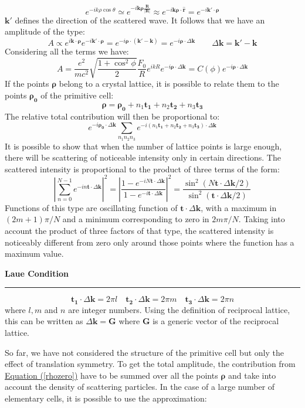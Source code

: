\documentclass[10.75pt,a4paper,openright,bottom=2cm]{article}
\renewcommand{\Vec}[1]{\boldsymbol{#1}}
\begin{document}
\[
e^{-ik\rho\cos\theta}\simeq e^{-i\Vec{k}\Vec{\rho}\frac{\Vec{R}}{|\Vec{R}|}}\approx e^{-i\Vec{k}\Vec{\rho}\cdot\Vec{\hat{r}}}=e^{-i\Vec{k'}\cdot\Vec{\rho}}
\]
$\Vec{k'}$ defines the direction of the scattered wave. It follows that we have an amplitude of the type:
\[
A\propto e^{i\Vec{k}\cdot\Vec{\rho}}e^{-i\Vec{k}'\cdot\Vec{\rho}}=e^{-i\Vec{\rho}\cdot(\Vec{k}'-\Vec{k})}=e^{-i\Vec{\rho}\cdot\Delta\Vec{k}} \qquad \Delta\Vec{k}=\Vec{k}'-\Vec{k}
\]
Considering all the terms we have:
\[
A=\frac{e^2}{mc^2}\sqrt{\frac{1+\cos^2\phi}{2}}\frac{F_0}{R}e^{ikR}e^{-i\Vec{\rho}\cdot\Delta\Vec{k}}=C(\phi)e^{-i\Vec{\rho}\cdot\Delta\Vec{k}}
\]
If the points $\Vec{\rho}$ belong to a crystal lattice, it is possible to relate them to the points $\Vec{\rho_0}$ of the primitive cell:
\[
\Vec{\rho}=\Vec{\rho_0}+n_1\Vec{t_1}+n_2\Vec{t_2}+n_3\Vec{t_3}
\]
The relative total contribution will then be proportional to:
\begin{equation}
\label{rhozero}
e^{-i\Vec{\rho_0}\cdot\Delta\Vec{k}}\sum_{n_1n_2n_3}e^{-i(n_1\Vec{t_1}+n_2\Vec{t_2}+n_3\Vec{t_3})\cdot\Delta\Vec{k}}
\end{equation}
It is possible to show that when the number of lattice points is large enough, there will be scattering of noticeable intensity only in certain directions. The scattered intensity is proportional to the product of three terms of the form:
\[
\left|\sum_{n=0}^{N-1}e^{-in\Vec{t}\cdot\Delta\Vec{k}}\right|^2=\left|\frac{1-e^{-iN\Vec{t}\cdot\Delta\Vec{k}}}{1-e^{-i\Vec{t}\cdot\Delta\Vec{k}}}\right|^2=\frac{\sin^2(N\Vec{t}\cdot\Delta\Vec{k}/2)}{\sin^2(\Vec{t}\cdot\Delta\Vec{k}/2)}
\]
Functions of this type are oscillating function of $\Vec{t}\cdot\Delta\Vec{k}$, with a maximum in $(2m+1)\pi/N$ and a minimum corresponding to zero in $2m\pi/N$. Taking into account the product of three factors of that type, the scattered intensity is noticeably different from zero only around those points where the function has a maximum value. 
\begin{mybox}
\textbf{Laue Condition{\color{blue!30}{g}}}
\hrule
\[
\Vec{t_1}\cdot\Delta\Vec{k}=2\pi l \quad \Vec{t_2}\cdot\Delta\Vec{k}=2\pi m \quad \Vec{t_3}\cdot\Delta\Vec{k}=2\pi n
\]
where $l,m$ and $n$ are integer numbers. Using the definition of reciprocal lattice, this can be written as $\Delta\Vec{k}=\Vec{G}$ where $\Vec{G}$ is a generic vector of the reciprocal lattice.
\end{mybox}\noindent
So far, we have not considered the structure of the primitive cell but only the effect of translation symmetry. To get the total amplitude, the contribution from \hyperref[rhozero]{Equation (\ref{rhozero})} have to be summed over all the points $\Vec{\rho}$ and take into account the density of scattering particles. In the case of a large number of elementary cells, it is possible to use the approximation:
\end{document}
